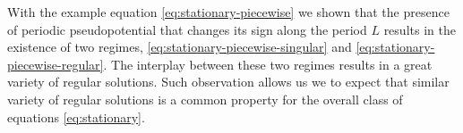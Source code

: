 With the example equation \eqref{eq:stationary-piecewise} we shown that the presence of periodic pseudopotential that changes its sign along the period $L$ results in the existence of two regimes, \eqref{eq:stationary-piecewise-singular} and \eqref{eq:stationary-piecewise-regular}.
The interplay between these two regimes results in a great variety of regular solutions.
Such observation allows us we to expect that similar variety of regular solutions is a common property for the overall class of equations \eqref{eq:stationary}.
